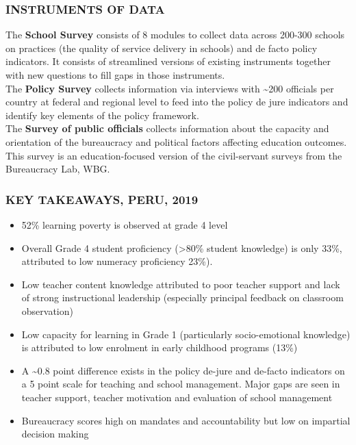 \documentclass[twocolumn]{article}
\providecommand{\tightlist}{%
  \setlength{\itemsep}{0pt}\setlength{\parskip}{0pt}}
\begin{document}
\hypertarget{instruments-of-data}{%
\subsubsection{\texorpdfstring{\textbf{INSTRUMENTS OF
DATA}}{INSTRUMENTS OF DATA}}\label{instruments-of-data}}

The \textbf{School Survey} consists of 8 modules to collect data across
200-300 schools on practices (the quality of service delivery in
schools) and de facto policy indicators. It consists of streamlined
versions of existing instruments together with new questions to fill
gaps in those instruments.\\
The \textbf{Policy Survey} collects information via interviews with
\textasciitilde{}200 officials per country at federal and regional level
to feed into the policy de jure indicators and identify key elements of
the policy framework.\\
The \textbf{Survey of public officials} collects information about the
capacity and orientation of the bureaucracy and political factors
affecting education outcomes. This survey is an education-focused
version of the civil-servant surveys from the Bureaucracy Lab, WBG.

\hypertarget{key-takeaways-peru-2019}{%
\subsubsection{\texorpdfstring{\textbf{KEY TAKEAWAYS, PERU,
2019}}{KEY TAKEAWAYS, PERU, 2019}}\label{key-takeaways-peru-2019}}

\begin{itemize}
\tightlist
\item
  52\% learning poverty is observed at grade 4 level
\item
  Overall Grade 4 student proficiency (\textgreater{}80\% student
  knowledge) is only 33\%, attributed to low numeracy proficiency 23\%).
\item
  Low teacher content knowledge attributed to poor teacher support and
  lack of strong instructional leadership (especially principal feedback
  on classroom observation)
\item
  Low capacity for learning in Grade 1 (particularly socio-emotional
  knowledge) is attributed to low enrolment in early childhood programs
  (13\%)
\item
  A \textasciitilde{}0.8 point difference exists in the policy de-jure
  and de-facto indicators on a 5 point scale for teaching and school
  management. Major gaps are seen in teacher support, teacher motivation
  and evaluation of school management
\item
  Bureaucracy scores high on mandates and accountability but low on
  impartial decision making
\end{itemize}
\end{document}

